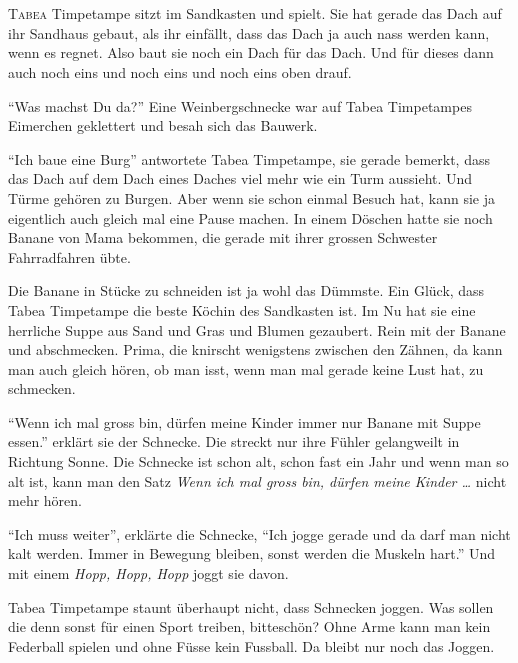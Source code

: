 \chapter*{}
\lettrine[lines=3]{\color{red}T}{abea} Timpetampe sitzt im Sandkasten und spielt. Sie hat gerade das Dach auf ihr Sandhaus gebaut, als ihr einfällt, dass das Dach ja auch nass werden kann, wenn es regnet. Also baut sie noch ein Dach für das Dach. Und für dieses dann auch noch eins und noch eins und noch eins oben drauf.

\enquote{Was machst Du da?} Eine Weinbergschnecke war auf Tabea Timpetampes Eimerchen geklettert und besah sich das Bauwerk. 

\enquote{Ich baue eine Burg} antwortete Tabea Timpetampe, sie gerade bemerkt, dass das Dach auf dem Dach eines Daches viel mehr wie ein Turm aussieht. Und Türme gehören zu Burgen. Aber wenn sie schon einmal Besuch hat, kann sie ja eigentlich auch gleich mal eine Pause machen. In einem Döschen hatte sie noch Banane von Mama bekommen, die gerade mit ihrer grossen Schwester Fahrradfahren übte. 

Die Banane in Stücke zu schneiden ist ja wohl das Dümmste. Ein Glück, dass Tabea Timpetampe die beste Köchin des Sandkasten ist. Im Nu hat sie eine herrliche Suppe aus Sand und Gras und Blumen gezaubert. Rein mit der Banane und abschmecken. Prima, die knirscht wenigstens zwischen den Zähnen, da kann man auch gleich hören, ob man isst, wenn man mal gerade keine Lust hat, zu schmecken.

\enquote{Wenn ich mal gross bin, dürfen meine Kinder immer nur Banane mit Suppe essen.} erklärt sie der Schnecke. Die streckt nur ihre Fühler gelangweilt in Richtung Sonne. Die Schnecke ist schon alt, schon fast ein Jahr und wenn man so alt ist, kann man den Satz \textit{Wenn ich mal gross bin, dürfen meine Kinder \dots} nicht mehr hören.

\enquote{Ich muss weiter}, erklärte die Schnecke, \enquote{Ich jogge gerade und da darf man nicht kalt werden. Immer in Bewegung bleiben, sonst werden die Muskeln hart.} Und mit einem \textit{Hopp, Hopp, Hopp} joggt sie  davon.

Tabea Timpetampe staunt überhaupt nicht, dass Schnecken joggen. Was sollen die denn sonst für einen Sport treiben, bitteschön? Ohne Arme kann man kein Federball spielen und ohne Füsse kein Fussball. Da bleibt nur noch das Joggen. 


